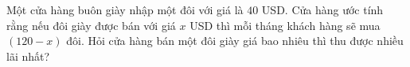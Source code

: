 \begin{ex}
Một cửa hàng buôn giày nhập một đôi với giá là $40$ USD. Cửa hàng ước tính rằng nếu đôi giày được bán với giá $x$ USD thì mỗi tháng khách hàng sẽ mua $(120-x)$ đôi. Hỏi cửa hàng bán một đôi giày giá bao nhiêu thì thu được nhiều lãi nhất?
\end{ex}
